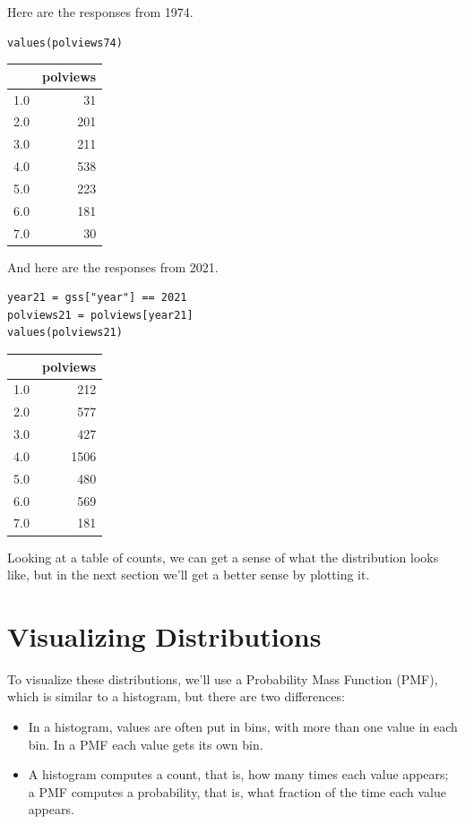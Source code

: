 Here are the responses from 1974.

\begin{lstlisting}[]
values(polviews74)
\end{lstlisting}

\begin{tabular}{lr}
\midrule
{} &  polviews \\
\midrule
1.0 &        31 \\
2.0 &       201 \\
3.0 &       211 \\
4.0 &       538 \\
5.0 &       223 \\
6.0 &       181 \\
7.0 &        30 \\
\midrule
\end{tabular}

And here are the responses from 2021.

\begin{lstlisting}[]
year21 = gss["year"] == 2021
polviews21 = polviews[year21]
values(polviews21)
\end{lstlisting}

\begin{tabular}{lr}
\midrule
{} &  polviews \\
\midrule
1.0 &       212 \\
2.0 &       577 \\
3.0 &       427 \\
4.0 &      1506 \\
5.0 &       480 \\
6.0 &       569 \\
7.0 &       181 \\
\midrule
\end{tabular}

Looking at a table of counts, we can get a sense of what the
distribution looks like, but in the next section we'll get a better
sense by plotting it.

\hypertarget{visualizing-distributions}{%
\section{Visualizing Distributions}\label{visualizing-distributions}}

To visualize these distributions, we'll use a Probability Mass Function
(PMF), which is similar to a histogram, but there are two differences:

\begin{itemize}
\item
  In a histogram, values are often put in bins, with more than one value
  in each bin. In a PMF each value gets its own bin.
\item
  A histogram computes a count, that is, how many times each value
  appears; a PMF computes a probability, that is, what fraction of the
  time each value appears.
\end{itemize}

